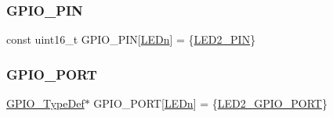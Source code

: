 \subsubsection{\texorpdfstring{GPIO\_PIN}{GPIO\_PIN}}
{\footnotesize\ttfamily const uint16\+\_\+t G\+P\+I\+O\+\_\+\+P\+IN\mbox{[}\mbox{\hyperlink{group___s_t_m32_f1_x_x___n_u_c_l_e_o___l_o_w___l_e_v_e_l___l_e_d_gab4be2480bf7d44d52aab1190a65a733c}{L\+E\+Dn}}\mbox{]} = \{\mbox{\hyperlink{group___s_t_m32_f1_x_x___n_u_c_l_e_o___l_o_w___l_e_v_e_l___l_e_d_gaf6f84078113b55354d20585131b386f7}{L\+E\+D2\+\_\+\+P\+IN}}\}}

\mbox{\label{group___s_t_m32_f1_x_x___n_u_c_l_e_o___l_o_w___l_e_v_e_l___private___variables_gadfddcc182c40163aaa7b3c7f36e42ed9}} 
\subsubsection{\texorpdfstring{GPIO\_PORT}{GPIO\_PORT}}
{\footnotesize\ttfamily \mbox{\hyperlink{struct_g_p_i_o___type_def}{G\+P\+I\+O\+\_\+\+Type\+Def}}$\ast$ G\+P\+I\+O\+\_\+\+P\+O\+RT\mbox{[}\mbox{\hyperlink{group___s_t_m32_f1_x_x___n_u_c_l_e_o___l_o_w___l_e_v_e_l___l_e_d_gab4be2480bf7d44d52aab1190a65a733c}{L\+E\+Dn}}\mbox{]} = \{\mbox{\hyperlink{group___s_t_m32_f1_x_x___n_u_c_l_e_o___l_o_w___l_e_v_e_l___l_e_d_gaf88822ae4b79d37c7735ce1160b59f68}{L\+E\+D2\+\_\+\+G\+P\+I\+O\+\_\+\+P\+O\+RT}}\}}

